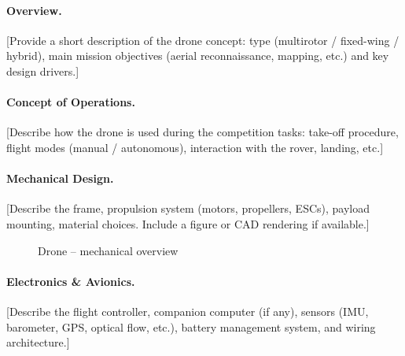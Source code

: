 %
%

\paragraph{Overview.}
[Provide a short description of the drone concept: type (multirotor / fixed-wing
/ hybrid), main mission objectives (aerial reconnaissance, mapping, etc.) and
key design drivers.]

\paragraph{Concept of Operations.}
[Describe how the drone is used during the competition tasks: take-off
procedure, flight modes (manual / autonomous), interaction with the rover,
landing, etc.]

\paragraph{Mechanical Design.}
[Describe the frame, propulsion system (motors, propellers, ESCs), payload
mounting, material choices. Include a figure or CAD rendering if available.]

\begin{figure}[H]
    \centering
    \caption{Drone -- mechanical overview}
    \label{fig:drone_mech}
\end{figure}

\paragraph{Electronics \& Avionics.}
[Describe the flight controller, companion computer (if any), sensors (IMU,
barometer, GPS, optical flow, etc.), battery management system, and wiring
architecture.]

